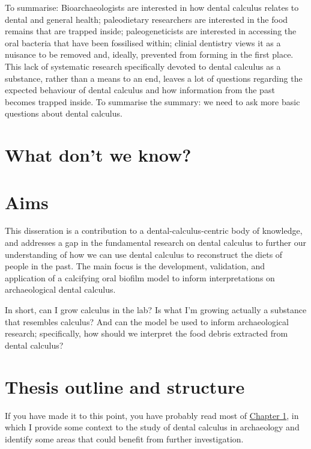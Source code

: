 \documentclass[
  letterpaper,
]{book}
\begin{document}
To summarise: Bioarchaeologists are interested in how dental calculus
relates to dental and general health; paleodietary researchers are
interested in the food remains that are trapped inside; paleogeneticists
are interested in accessing the oral bacteria that have been fossilised
within; clinial dentistry views it as a nuisance to be removed and,
ideally, prevented from forming in the first place. This lack of
systematic research specifically devoted to dental calculus as a
substance, rather than a means to an end, leaves a lot of questions
regarding the expected behaviour of dental calculus and how information
from the past becomes trapped inside. To summarise the summary: we need
to ask more basic questions about dental calculus.

\hypertarget{what-dont-we-know}{%
\section{What don't we know?}\label{what-dont-we-know}}

\hypertarget{intro-aims}{%
\section{Aims}\label{intro-aims}}

This disseration is a contribution to a dental-calculus-centric body of
knowledge, and addresses a gap in the fundamental research on dental
calculus to further our understanding of how we can use dental calculus
to reconstruct the diets of people in the past. The main focus is the
development, validation, and application of a calcifying oral biofilm
model to inform interpretations on archaeological dental calculus.

In short, can I grow calculus in the lab? Is what I'm growing actually a
substance that resembles calculus? And can the model be used to inform
archaeological research; specifically, how should we interpret the food
debris extracted from dental calculus?

\hypertarget{thesis-outline-and-structure}{%
\section{Thesis outline and
structure}\label{thesis-outline-and-structure}}

If you have made it to this point, you have probably read most of
\protect\hyperlink{chap-intro}{Chapter 1}, in which I provide some
context to the study of dental calculus in archaeology and identify some
areas that could benefit from further investigation.
\end{document}
